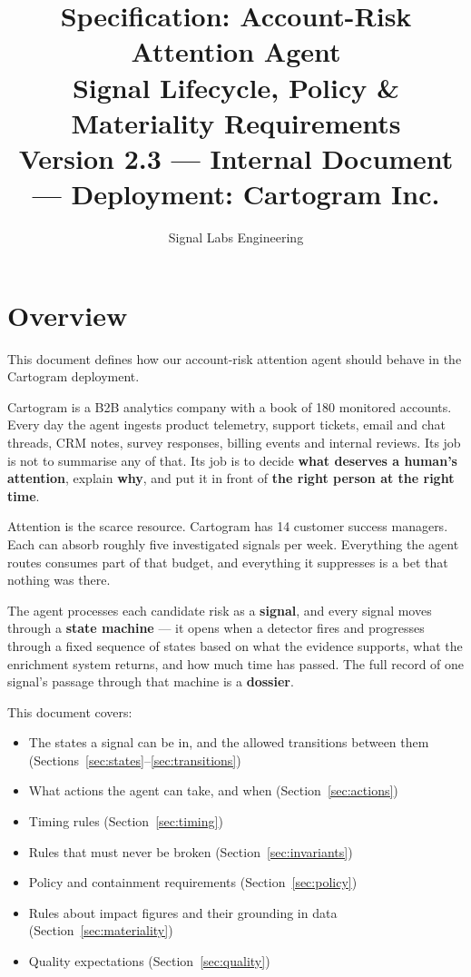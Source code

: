\documentclass[11pt, a4paper]{article}
\title{%
  \vspace{-1cm}
  \textbf{Specification: Account-Risk Attention Agent} \\[0.3cm]
  \large Signal Lifecycle, Policy \& Materiality Requirements \\[0.2cm]
  \normalsize Version 2.3 --- Internal Document --- Deployment: Cartogram Inc.
}
\author{Signal Labs Engineering}
\date{}
\begin{document}
\maketitle
\thispagestyle{fancy}

\section{Overview}

This document defines how our account-risk attention agent should behave in the Cartogram deployment.

Cartogram is a B2B analytics company with a book of 180 monitored accounts. Every day the agent ingests product telemetry, support tickets, email and chat threads, CRM notes, survey responses, billing events and internal reviews. Its job is not to summarise any of that. Its job is to decide \textbf{what deserves a human's attention}, explain \textbf{why}, and put it in front of \textbf{the right person at the right time}.

Attention is the scarce resource. Cartogram has 14 customer success managers. Each can absorb roughly five investigated signals per week. Everything the agent routes consumes part of that budget, and everything it suppresses is a bet that nothing was there.

The agent processes each candidate risk as a \textbf{signal}, and every signal moves through a \textbf{state machine} --- it opens when a detector fires and progresses through a fixed sequence of states based on what the evidence supports, what the enrichment system returns, and how much time has passed. The full record of one signal's passage through that machine is a \textbf{dossier}.

This document covers:
\begin{itemize}[nosep]
  \item The states a signal can be in, and the allowed transitions between them (Sections~\ref{sec:states}--\ref{sec:transitions})
  \item What actions the agent can take, and when (Section~\ref{sec:actions})
  \item Timing rules (Section~\ref{sec:timing})
  \item Rules that must never be broken (Section~\ref{sec:invariants})
  \item Policy and containment requirements (Section~\ref{sec:policy})
  \item Rules about impact figures and their grounding in data (Section~\ref{sec:materiality})
  \item Quality expectations (Section~\ref{sec:quality})
\end{itemize}
\end{document}
